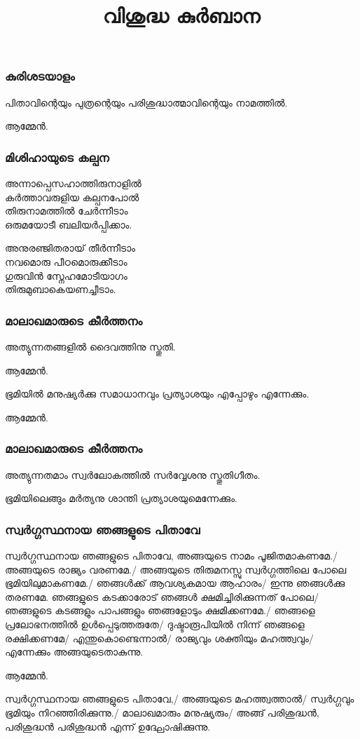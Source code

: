 \documentclass[20pt]{beamer}
\title{വിശുദ്ധ കുര്‍ബാന}
\newcommand{\Priest}[1]{\color{white}#1}
\newcommand{\People}[1]{\color{yellow}#1}
\newcommand{\Ammen}{\People{ആമ്മേന്‍.}}
\begin{document}
\begin{frame}
\frametitle{കുരിശടയാളം}
\Priest{
പിതാവിന്റെയും പുത്രന്റെയും പരിശുദ്ധാത്മാവിന്റെയും നാമത്തില്‍.}

\Ammen
\end{frame}

\begin{frame}
\frametitle{മിശിഹായുടെ കല്പന}
\Priest{
അന്നാപ്പെസഹാത്തിരുനാളില്‍\\
കര്‍ത്താവരുളിയ കല്പനപോല്‍\\
തിരുനാമത്തില്‍ ചേര്‍ന്നീടാം\\
ഒരുമയോടീ ബലിയര്‍പ്പിക്കാം.}\par
\People{
അനുരഞ്ജിതരായ് തീര്‍ന്നീടാം\\
നവമൊരു പീഠമൊരുക്കീടാം\\
ഗുരുവിന്‍ സ്നേഹമോടീയാഗം\\
തിരുമുബാകെയണച്ചീടാം.}
\end{frame}

\begin{frame}
\frametitle{മാലാഖമാരുടെ കീര്‍ത്തനം}
\Priest{
അത്യുന്നതങ്ങളില്‍ ദൈവത്തിനു സ്തുതി.}\par
\Ammen\par
\Priest{
ഭൂമിയില്‍ മനുഷ്യർക്കു സമാധാനവും പ്രത്യാശയും എപ്പോഴും എന്നേക്കും.}\par
\Ammen
\end{frame}

\begin{frame}
\frametitle{മാലാഖമാരുടെ കീര്‍ത്തനം}
\Priest{
അത്യുന്നതമാം സ്വര്‍ലോകത്തില്‍ സര്‍വ്വേശനു സ്തുതിഗീതം.}\par
\People{
ഭൂമിയിലെങ്ങും മര്‍ത്യനു ശാന്തി പ്രത്യാശയുമെന്നേക്കും.}
\end{frame}

\begin{frame}[allowframebreaks]
\frametitle{സ്വര്‍ഗ്ഗസ്ഥനായ ഞങ്ങളുടെ പിതാവേ}
\Priest{
സ്വർഗ്ഗസ്ഥനായ ഞങ്ങളുടെ പിതാവേ,}
\People{
അങ്ങയുടെ നാമം പൂജിതമാകണമേ./ അങ്ങയുടെ രാജ്യം വരണമേ./
അങ്ങയുടെ തിരുമനസ്സു സ്വര്‍ഗ്ഗത്തിലെ പോലെ ഭൂമിയിലുമാകണമേ./
ഞങ്ങള്‍ക്ക് ആവശ്യകമായ ആഹാരം/ ഇന്നു ഞങ്ങള്‍ക്കു തരണമേ.
ഞങ്ങളുടെ കടക്കാരോട് ഞങ്ങള്‍ ക്ഷമിച്ചിരിക്കുന്നത് പോലെ/
ഞങ്ങളുടെ കടങ്ങളും പാപങ്ങളും ഞങ്ങളോടും ക്ഷമിക്കണമേ./
ഞങ്ങളെ പ്രലോഭനത്തില്‍ ഉള്‍പ്പെടുത്തരുതേ/ ദുഷ്ടാരൂപിയില്‍ 
നിന്ന് ഞങ്ങളെ രക്ഷിക്കണമേ/ എന്തുകൊണ്ടെന്നാല്‍/ രാജ്യവും
ശക്തിയും മഹത്ത്വവും/ എന്നേക്കും അങ്ങയുടെതാകുന്നു.\par\Ammen}
\end{frame}

\begin{frame}
\People{
സ്വർഗ്ഗസ്ഥനായ ഞങ്ങളുടെ പിതാവേ,/ അങ്ങയുടെ മഹത്ത്വത്താല്‍/
സ്വര്‍ഗ്ഗവും ഭൂമിയും നിറഞ്ഞിരിക്കുന്നു./ മാലാഖമാരും മനുഷ്യരും/
അങ്ങ് പരിശുദ്ധന്‍, പരിശുദ്ധന്‍ പരിശുദ്ധന്‍ എന്ന് ഉദ്ഘോഷിക്കുന്നു.}
\end{frame}
\end{document}
